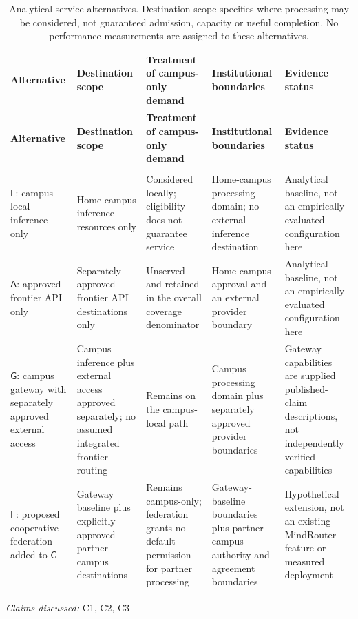 \documentclass[11pt]{article}
\begin{document}
\begin{landscape}
\small
\begin{longtable}{@{}>{\raggedright\arraybackslash}p{}>{\raggedright\arraybackslash}p{}>{\raggedright\arraybackslash}p{}>{\raggedright\arraybackslash}p{}>{\raggedright\arraybackslash}p{}@{}}
\caption{Analytical service alternatives. Destination scope specifies where processing may be considered, not guaranteed admission, capacity or useful completion. No performance measurements are assigned to these alternatives.}\\
\toprule
\textbf{Alternative} & \textbf{Destination scope} & \textbf{Treatment of campus-only demand} & \textbf{Institutional boundaries} & \textbf{Evidence status}\\
\midrule
\endfirsthead
\toprule
\textbf{Alternative} & \textbf{Destination scope} & \textbf{Treatment of campus-only demand} & \textbf{Institutional boundaries} & \textbf{Evidence status}\\
\midrule
\endhead
\midrule
\multicolumn{5}{r}{\footnotesize Continued on next page}\\
\endfoot
\bottomrule
\endlastfoot
$\mathsf{L}$: campus-local inference only & Home-campus inference resources only & Considered locally; eligibility does not guarantee service & Home-campus processing domain; no external inference destination & Analytical baseline, not an empirically evaluated configuration here\\
$\mathsf{A}$: approved frontier API only & Separately approved frontier API destinations only & Unserved and retained in the overall coverage denominator & Home-campus approval and an external provider boundary & Analytical baseline, not an empirically evaluated configuration here\\
$\mathsf{G}$: campus gateway with separately approved external access & Campus inference plus external access approved separately; no assumed integrated frontier routing & Remains on the campus-local path & Campus processing domain plus separately approved provider boundaries & Gateway capabilities are supplied published-claim descriptions, not independently verified capabilities\\
$\mathsf{F}$: proposed cooperative federation added to $\mathsf{G}$ & Gateway baseline plus explicitly approved partner-campus destinations & Remains campus-only; federation grants no default permission for partner processing & Gateway-baseline boundaries plus partner-campus authority and agreement boundaries & Hypothetical extension, not an existing MindRouter feature or measured deployment\\
\end{longtable}
\par{}
\end{landscape}
\textit{Claims discussed: }C1, C2, C3
\end{document}
